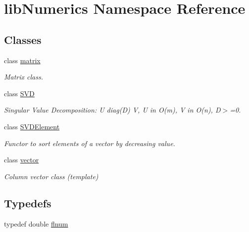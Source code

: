 \hypertarget{namespacelibNumerics}{}\section{lib\+Numerics Namespace Reference}
\label{namespacelibNumerics}
\subsection*{Classes}
\begin{DoxyCompactItemize}
\item 
class \hyperlink{classlibNumerics_1_1matrix}{matrix}
\begin{DoxyCompactList}\small\item\em Matrix class. \end{DoxyCompactList}\item 
class \hyperlink{classlibNumerics_1_1SVD}{S\+V\+D}
\begin{DoxyCompactList}\small\item\em Singular Value Decomposition\+: U diag(\+D) V, U in O(m), V in O(n), D$>$=0. \end{DoxyCompactList}\item 
class \hyperlink{classlibNumerics_1_1SVDElement}{S\+V\+D\+Element}
\begin{DoxyCompactList}\small\item\em Functor to sort elements of a vector by decreasing value. \end{DoxyCompactList}\item 
class \hyperlink{classlibNumerics_1_1vector}{vector}
\begin{DoxyCompactList}\small\item\em Column vector class (template) \end{DoxyCompactList}\end{DoxyCompactItemize}
\subsection*{Typedefs}
\begin{DoxyCompactItemize}
\item 
typedef double \hyperlink{namespacelibNumerics_ac94c07350f743d00e3dbcb33b6e974b0}{flnum}
\end{DoxyCompactItemize}
